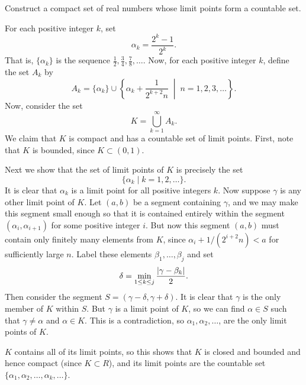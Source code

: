  Construct a compact set of real numbers whose limit
points form a countable set.
\begin{solution}
  For each positive integer $k$, set
  \begin{equation*}
    \alpha_k = \frac{2^k - 1}{2^k}.
  \end{equation*}
  That is, $\{\alpha_k\}$ is the sequence
  $\frac12, \frac34, \frac78, \dots$. Now, for each positive integer
  $k$, define the set $A_k$ by
  \begin{equation*}
    A_k = \{\alpha_k\} \cup \left\{ \alpha_k + \frac1{2^{k+2}n}
      \;\middle|\; n = 1, 2, 3, \dots \right\}.
  \end{equation*}
  Now, consider the set
  \begin{equation*}
    K = \bigcup_{k=1}^\infty A_k.
  \end{equation*}
  We claim that $K$ is compact and has a countable set of limit
  points. First, note that $K$ is bounded, since $K\subset(0,1)$.

  Next we show that the set of limit points of $K$ is precisely the
  set
  \begin{equation*}
    \{\alpha_k \mid k = 1,2,\dots\}.
  \end{equation*}
  It is clear that $\alpha_k$ is a limit point for all positive
  integers $k$. Now suppose $\gamma$ is any other limit point of
  $K$. Let $(a,b)$ be a segment containing $\gamma$, and we may make
  this segment small enough so that it is contained entirely within
  the segment $(\alpha_i,\alpha_{i+1})$ for some positive integer
  $i$. But now this segment $(a,b)$ must contain only finitely many
  elements from $K$, since $\alpha_i + 1/(2^{i+2}n) < a$ for
  sufficiently large $n$. Label these elements $\beta_1,\dots,\beta_j$
  and set
  \begin{equation*}
    \delta = \min_{1\leq k\leq j}\frac{\lvert{\gamma - \beta_k}\rvert}2.
  \end{equation*}
  Then consider the segment $S = (\gamma - \delta, \gamma +
  \delta)$. It is clear that $\gamma$ is the only member of $K$ within
  $S$.  But $\gamma$ is a limit point of $K$, so we can find
  $\alpha\in S$ such that $\gamma\neq\alpha$ and $\alpha\in K$. This
  is a contradiction, so $\alpha_1,\alpha_2,\dots$, are the only limit
  points of $K$.

  $K$ contains all of its limit points, so this shows that $K$ is
  closed and bounded and hence compact (since $K\subset R$), and its
  limit points are the countable set
  $\{\alpha_1,\alpha_2,\dots,\alpha_k,\dots\}$.
\end{solution}

